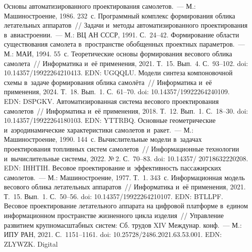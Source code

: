 \begin{multicols}{2}
{\small\frenchspacing
 {\baselineskip=10.5pt
 \begin{thebibliography}{99}   
 Основы автоматизированного 
проектирования самолетов.~--- М.: Машиностроение, 1986. 232~с.
 Программный комплекс 
формирования облика летательных аппаратов~// Задачи и~методы автоматизированного 
проектирования в~авиастроении.~--- М.: ВЦ АН СССР, 1991. С.~24--42.
 Формирование области существования самолета в~пространстве 
обобщенных проектных параметров.~--- М.: МАИ, 1994. 55~с. 
 Теоретические основы формирования весового 
облика самолета~// Информатика и~её применения, 2021. Т.~15. Вып.~4. С.~93--102. doi: 
10.14357/19922264210413. EDN: UGQQLU.
 Модели синтеза компоновочной схемы в~задаче 
формирования облика самолёта~// Информатика и~её применения, 2024. Т.~18. Вып.~1.  
С.~61--70. doi: 10.14357/19922264240109. EDN: DSPGKV.
 Автоматизированная система 
весового проектирования самолетов~// Информатика и~её применения, 2018. Т.~12. Вып.~1. 
С.~18--30. doi: 10.14357/19922264180103.  EDN: YTTRBQ.
 Основные геометрические и~аэродинамические 
характеристики самолетов и~ракет.~--- М.: Машиностроение, 1990. 144~с.
 Вычислительные модели в~задачах проектирования 
топливных систем самолетов~// Информационные технологии и~вычислительные системы, 
2022. №\,2. С.~70--83. doi: 10.14357/ 20718632220208. EDN: IHHTIH.
 Весовое проектирование и~эффективность 
пассажирских самолетов.~---  М.: Машиностроение, 1977. Т.~1. 343~с.
 Информационная модель весового облика 
летательных аппаратов~// Информатика и~её применения, 2021. Т.~15. Вып.~1. С.~50--56. 
doi: 10.14357/19922264210107. EDN: BTLLPF.
 Весовое проектирование летательного 
аппарата на цифровой платформе в~едином информационном пространстве жизненного 
цикла изделия~// Управ\-ле\-ние развитием крупномасштабных систем: Сб. трудов XIV 
Междунар. конф.~--- М.: ИПУ РАН, 2021. С.~1151--1161. doi: 10.25728/2486.2021.63.53.001. 
EDN: ZLYWZK.
 Digital 

\end{thebibliography}}}
\end{multicols}
